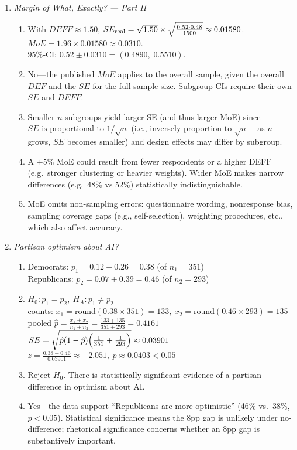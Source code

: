 \documentclass{article}
\begin{document}
\begin{enumerate}
\item \emph{Margin of What, Exactly? — Part II}
\begin{enumerate}[label=(\alph*)]
  \item
    With $DEFF\approx 1.50$, $SE_{\rm real}=\sqrt{1.50}\times\sqrt{\tfrac{0.52\cdot0.48}{1500}}\approx0.01580$.\\
    $MoE=1.96\times0.01580\approx0.0310$.\\
    $95\%$‑CI: $0.52\pm0.0310=(0.4890,\;0.5510)$.
  \item
    No—the published $MoE$ applies to the overall sample, given the overall $DEF$ and the $SE$ for the full sample size. Subgroup CIs require their own $SE$ and $DEFF$.
  \item
    Smaller‐\(n\) subgroups yield larger SE (and thus larger MoE) since $SE \text{ is proportional to }1/\sqrt{n}$ (i.e., inversely proportion to $\sqrt{n}$ -- as $n$ grows, $SE$ becomes smaller) and design effects may differ by subgroup.
  \item
    A $\pm 5\%$ MoE could result from fewer respondents or a higher DEFF (e.g.\ stronger clustering or heavier weights). Wider MoE makes narrow differences (e.g.\ 48\% vs 52\%) statistically indistinguishable.
  \item
    MoE omits non‑sampling errors: questionnaire wording, nonresponse bias, sampling coverage gaps (e.g., self-selection), weighting procedures, etc., which also affect accuracy.
\end{enumerate}

\item \emph{Partisan optimism about AI?}
\begin{enumerate}[label=(\alph*)]
  \item
    Democrats: $p_1=0.12+0.26=0.38$ \quad (of $n_1=351$)\\
    Republicans: $p_2=0.07+0.39=0.46$ \quad (of $n_2=293$)
  \item
    $H_0:p_1=p_2,\ H_A:p_1\neq p_2$\\
    counts: $x_1=\mathrm{round}(0.38\times 351)=133,\ x_2=\mathrm{round}(0.46\times 293)=135$\\
    pooled $\displaystyle \hat p=\frac{x_1+x_2}{n_1+n_2}=\frac{133+135}{351+293}=0.4161$\\
    $SE=\sqrt{\hat p(1-\hat p)\Bigl(\frac1{351}+\frac1{293}\Bigr)}\approx0.03901$\\
    $z=\frac{0.38-0.46}{0.03901}\approx -2.051,\ p\approx0.0403<0.05$
  \item
    Reject $H_0$.  There is statistically significant evidence of a partisan difference in optimism about AI.
  \item
    Yes—the data support “Republicans are more optimistic” (46\% vs.\ 38\%, $p<0.05$).  Statistical significance means the 8pp gap is unlikely under no­-difference; rhetorical significance concerns whether an 8pp gap is substantively important.
\end{enumerate}

\end{enumerate} %
\end{document}

